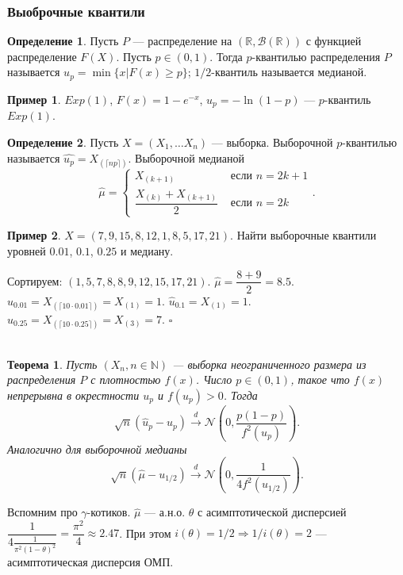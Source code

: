 \documentclass[12pt]{report}
\newenvironment{solution}{{\bfseries Решение:}}{$\square$\\\\}
\newtheorem{theorem}{Теорема}
\theoremstyle{definition}
\newtheorem{definition}{Определение}
\newtheorem{example}{Пример}
\begin{document}
\subsubsection{Выоброчные квантили}
\begin{definition}
	Пусть $P$ — распределение на $(\mathbb{R}, \mathcal{B}(\mathbb{R}))$ с функцией распределение $F(X)$. Пусть $p \in (0, 1)$. Тогда $p$-квантилью распределения $P$ называется $u_p = \min \{x | F(x) \geqslant p\}$; $1/2$-квантиль называется медианой.
\end{definition}
\begin{example}
	$Exp(1)$, $F(x) = 1 - e^{-x}$, $u_p = -\ln(1-p)$ — $p$-квантиль $Exp(1)$.
\end{example}
\begin{definition}
	Пусть $X = (X_1, \ldots X_n)$ — выборка. Выборочной $p$-квантилью называется $\hat{u_p} = X_{(\lceil np \rceil)}$. Выборочной медианой $$ \hat{\mu} = \begin{cases}
		X_{(k+1)} & \text{ если } n = 2k + 1\\
		\dfrac{X_{(k)} + X_{(k+1)}}{2} & \text{ если } n = 2k
	\end{cases}.$$
\end{definition}
\begin{example}
	$X = (7, 9, 15, 8, 12, 1, 8, 5, 17, 21)$. Найти выборочные квантили уровней $0.01$, $0.1$, $0.25$ и медиану.
\end{example}
\begin{solution}
	Сортируем: $(1, 5, 7, 8, 8, 9, 12, 15, 17, 21)$. $\hat{\mu} = \dfrac{8 + 9}{2} = 8.5$. $\hat{u}_{0.01} = X_{(\lceil 10 \cdot 0.01 \rceil)} = X_{(1)} = 1$.
	 $\hat{u}_{0.1} = X_{(1)} = 1$. $\hat{u}_{0.25} = X_{(\lceil 10 \cdot 0.25 \rceil)} = X_{(3)} = 7$.
\end{solution}
\begin{theorem}
	Пусть $ (X_n, n \in \mathbb{N})$ — выборка неограниченного размера из распределения $P$ с плотностью $f(x)$. Число $p \in (0, 1)$, такое что $f(x)$ непрерывна
	в окрестности $u_p$ и $f(u_p) > 0$. Тогда $$\sqrt{n}(\hat{u}_p - u_p) \xrightarrow{d} \mathcal{N}\left(0, \dfrac{p(1-p)}{f^2(u_p)}\right).$$
	Аналогично для выборочной медианы $$\sqrt{n}(\hat{\mu} - u_{1/2}) \xrightarrow{d} \mathcal{N}\left(0, \dfrac{1}{4f^2(u_{1/2})}\right).$$
\end{theorem}
Вспомним про $\gamma$-котиков. $\hat{\mu}$ — а.н.о. $\theta$ с асимптотической дисперсией $\dfrac{1}{4\frac{1}{\pi^2 (1-\theta)^2}} = \dfrac{\pi^2}{4} \approx 2.47$. При этом $i(\theta) = 1/2 \Rightarrow 1/ i(\theta) = 2$ — асимптотическая дисперсия ОМП.
\end{document}
